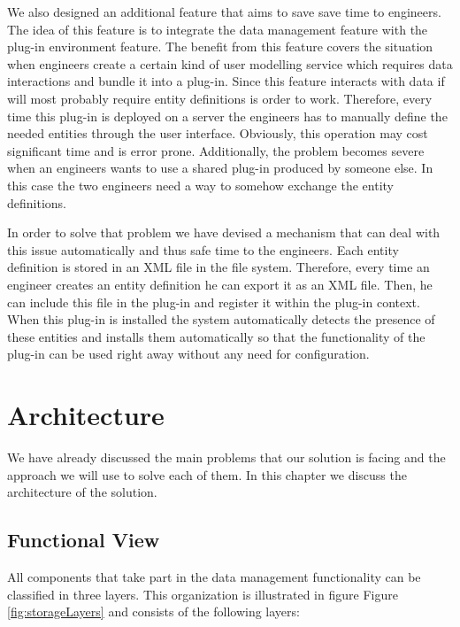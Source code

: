 We also designed an additional feature that aims to save save time to engineers. The idea of this feature is to integrate the data management feature with the plug-in environment feature. The benefit from this feature covers the situation when engineers create a certain kind of user modelling service which requires data interactions and  bundle it into a plug-in. Since this feature interacts with data if will most probably require entity definitions is order to work. Therefore, every time this plug-in is deployed on a server the engineers has to manually define the needed entities through the user interface. Obviously, this operation may cost significant time and is error prone. Additionally, the problem becomes severe when an engineers wants to use a shared plug-in produced by someone else. In this case the two engineers need a way to somehow exchange the entity definitions.

In order to solve that problem we have devised a mechanism that can deal with this issue automatically and thus safe time to the engineers. Each entity definition is stored in an XML file in the file system. Therefore, every time an engineer creates an entity definition he can export it as an XML file. Then, he can include this file in the plug-in and register it within the plug-in context. When this plug-in is installed the system automatically detects the presence of these entities and installs them automatically so that the functionality of the plug-in can be used right away without any need for configuration.

\section{Architecture}
\label{sec:architectureStorage}

We have already discussed the main problems that our solution is facing and the approach we will use to solve each of them. In this chapter we discuss the architecture of the solution.

\subsection{Functional View}

All components that take part in the data management functionality can be classified in three layers. This organization is illustrated in figure Figure \ref{fig:storageLayers} and consists of the following layers:

